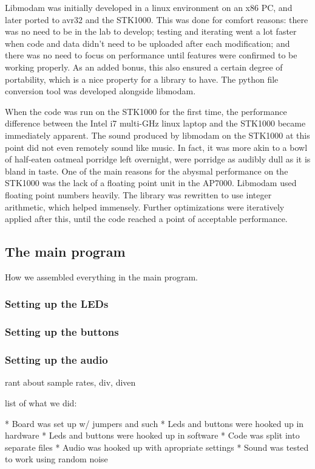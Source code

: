 Libmodam was initially developed in a linux environment on an x86 PC, and later ported to avr32 and the STK1000.
This was done for comfort reasons: there was no need to be in the lab to develop; testing and iterating went a lot faster when code and data didn't need to be uploaded after each modification; and there was no need to focus on performance until features were confirmed to be working properly.
As an added bonus, this also ensured a certain degree of portability, which is a nice property for a library to have.
The python file conversion tool was developed alongside libmodam.

When the code was run on the STK1000 for the first time, the performance difference between the Intel i7 multi-GHz linux laptop and the STK1000 became immediately apparent.
The sound produced by libmodam on the STK1000 at this point did not even remotely sound like music.
In fact, it was more akin to a bowl of half-eaten oatmeal porridge left overnight, were porridge as audibly dull as it is bland in taste.
One of the main reasons for the abysmal performance on the STK1000 was the lack of a floating point unit in the AP7000.
Libmodam used floating point numbers heavily.
The library was rewritten to use integer arithmetic, which helped immensely.
Further optimizations were iteratively applied after this, until the code reached a point of acceptable performance.

\subsection{The main program}

How we assembled everything in the main program.

\subsubsection{Setting up the LEDs}
\subsubsection{Setting up the buttons}
\subsubsection{Setting up the audio}
rant about sample rates, div, diven


list of what we did:

* Board was set up w/ jumpers and such
* Leds and buttons were hooked up in hardware
* Leds and buttons were hooked up in software
* Code was split into separate files
* Audio was hooked up with apropriate settings
* Sound was tested to work using random noise


